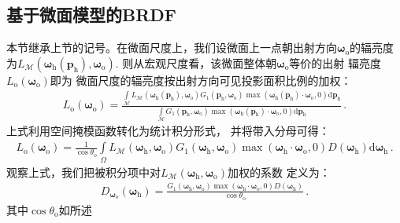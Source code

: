 \subsection{基于微面模型的BRDF}\label{sub:基于微面模型的BRDF}
本节继承上节的记号。在微面尺度上，我们设微面上一点朝出射方向${\bm\omega}_{\mathrm{o}}$的辐亮度
为$L_{\mathcal{M}}({\bm\omega}_{\mathrm{h}}({\bm p}_{\mathrm{h}}),{\bm\omega}_{\mathrm{o}})$.
则从宏观尺度看，该微面整体朝${\bm\omega}_{\mathrm{o}}$等价的出射
辐亮度$L_{\mathrm{o}}({\bm\omega}_{\mathrm{o}})$即为
微面尺度的辐亮度按出射方向可见投影面积比例的加权：
\begin{align}\label{eq:08ex01-RadianceMicrofacetAverageSum}
    L_{\mathrm{o}}({\bm\omega}_{\mathrm{o}})
    =\frac{\displaystyle\int\limits_{\mathcal{M}}
    {L_{\mathcal{M}}({\bm\omega}_{\mathrm{h}}({\bm p}_{\mathrm{h}}),{\bm\omega}_{\mathrm{o}})
    G_1({\bm p}_{\mathrm{h}},{\bm\omega}_{\mathrm{o}})
    \max({\bm\omega}_{\mathrm{h}}({\bm p}_{\mathrm{h}})\cdot{\bm\omega}_{\mathrm{o}},0)
    \mathrm{d}{\bm p}_{\mathrm{h}}}}
    {\displaystyle\int\limits_{\mathcal{M}}
    {G_1({\bm p}_{\mathrm{h}},{\bm\omega}_{\mathrm{o}})
    \max({\bm\omega}_{\mathrm{h}}({\bm p}_{\mathrm{h}})\cdot{\bm\omega}_{\mathrm{o}},0)
    \mathrm{d}{\bm p}_{\mathrm{h}}}}\, .
\end{align}
上式利用空间掩模函数转化为统计积分形式，
并将带入分母可得：
\begin{align}\label{eq:08ex01-RadianceMicrofacet}
    L_{\mathrm{o}}({\bm\omega}_{\mathrm{o}})
    =\frac{1}{\cos\theta_{\mathrm{o}}}\int\limits_{\varOmega}
    L_{\mathcal{M}}({\bm\omega}_{\mathrm{h}},{\bm\omega}_{\mathrm{o}})
    G_1({\bm\omega}_{\mathrm{h}},{\bm\omega}_{\mathrm{o}})
    \max({\bm\omega}_{\mathrm{h}}\cdot{\bm\omega}_{\mathrm{o}},0)
    D({\bm\omega}_{\mathrm{h}})\mathrm{d}{\bm\omega}_{\mathrm{h}}\, .
\end{align}
观察上式，我们把被积分项中对$L_{\mathcal{M}}({\bm\omega}_{\mathrm{h}},{\bm\omega}_{\mathrm{o}})$加权的系数
定义为：
\begin{align}\label{eq:08ex01-DistributionOfVisibleNormals}
    D_{{\bm\omega}_{\mathrm{o}}}({\bm\omega}_{\mathrm{h}})
    =\frac{G_1({\bm\omega}_{\mathrm{h}},{\bm\omega}_{\mathrm{o}})
        \max({\bm\omega}_{\mathrm{h}}\cdot{\bm\omega}_{\mathrm{o}},0)
        D({\bm\omega}_{\mathrm{h}})}{\cos\theta_{\mathrm{o}}}\, .
\end{align}
其中$\cos\theta_{\mathrm{o}}$如所述
